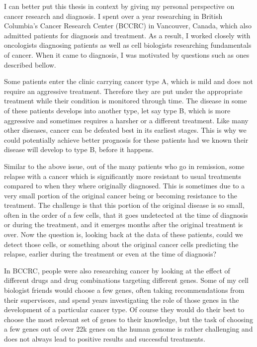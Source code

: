 I can better put this thesis in context by giving my personal perspective on cancer research and diagnosis. I spent over a year researching in British Columbia's Cancer Research Center (BCCRC) in Vancouver, Canada, which also admitted patients for diagnosis and treatment. As a result, I worked closely with oncologists diagnosing patients as well as  cell biologists researching fundamentals of cancer. When it came to diagnosis, I was motivated by questions such as ones described bellow.

Some patients enter the clinic carrying cancer type A, which is mild and does not require an aggressive treatment. Therefore they are put under the appropriate treatment while their condition is monitored through time. The disease in some of these patients develops into another type, let say type B, which is more aggressive and sometimes requires a harsher or a different treatment. Like many other diseases, cancer can be defeated best in its earliest stages. This is why we could potentially achieve better prognosis for these patients had we known their disease will develop to type B, before it happens.

Similar to the above issue, out of the many patients who go in remission, some relapse with a cancer which is significantly more resistant to usual treatments compared to when they where originally diagnosed. This is sometimes due to a very small portion of the original cancer being or becoming resistance to the treatment. The challenge is that this portion of the original disease is so small, often in the order of a few cells, that it goes undetected at the time of diagnosis or during the treatment, and it emerges months after the original treatment is over. Now the question is, looking back at the data of these patients, could we detect those cells, or something about the original cancer cells predicting the relapse, earlier during the treatment or even at the time of diagnosis?

In BCCRC, people were also researching cancer by looking at the effect of different drugs and drug combinations targeting different genes. Some of my cell biologist friends would choose a few genes, often taking recommendations from their supervisors, and spend years investigating the role of those genes in the development of a particular cancer type. Of course they would do their best to choose the most relevant set of genes to their knowledge, but the task of choosing a few genes out of over 22k genes on the human genome is rather challenging and does not always lead to positive results and successful treatments.

